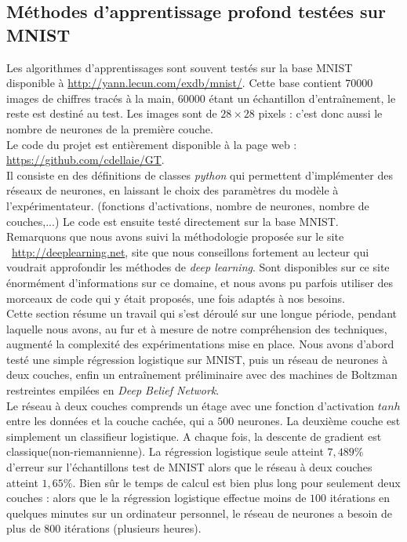 \documentclass{article}
\theoremstyle{definition}
\begin{document}
\subsection{Méthodes d'apprentissage profond testées sur MNIST}

Les algorithmes d'apprentissages sont souvent testés sur la base MNIST disponible à \url{http://yann.lecun.com/exdb/mnist/}. Cette base contient $70 000$ images de chiffres tracés à la main, $60 000$ étant un échantillon d'entraînement, le reste est destiné au test. Les images sont de $28\times 28$ pixels : c'est donc aussi le nombre de neurones de la première couche.\\

Le code du projet est entièrement disponible à la page web : \url{https://github.com/cdellaie/GT}.\\

Il consiste en des définitions de classes \textit{python} qui permettent d'implémenter des réseaux de neurones, en laissant le choix des paramètres du modèle à l'expérimentateur. (fonctions d'activations, nombre de neurones, nombre de couches,...) Le code est ensuite testé directement sur la base MNIST. Remarquons que nous avons suivi la méthodologie proposée sur le site ~\url{http://deeplearning.net}, site que nous conseillons fortement au lecteur qui voudrait approfondir les méthodes de \textit{deep learning}. Sont disponibles sur ce site énormément d'informations sur ce domaine, et nous avons pu parfois utiliser des morceaux de code qui y était proposés, une fois adaptés à nos besoins.\\

Cette section résume un travail qui s'est déroulé sur une longue période, pendant laquelle nous avons, au fur et à mesure de notre compréhension des techniques, augmenté la complexité des expérimentations mise en place. Nous avons d'abord testé une simple régression logistique sur MNIST, puis un réseau de neurones à deux couches, enfin un entraînement préliminaire avec des machines de Boltzman restreintes empilées en \textit{Deep Belief Network}. \\

Le réseau à deux couches comprends un étage avec une fonction d'activation $tanh$ entre les données et la couche cachée, qui a $500$ neurones. La deuxième couche est simplement un classifieur logistique. A chaque fois, la descente de gradient est classique(non-riemannienne). La régression logistique seule atteint $7,489\%$ d'erreur sur l'échantillons test de MNIST alors que le réseau à deux couches atteint $1,65\%$. Bien sûr le temps de calcul est bien plus long pour seulement deux couches : alors que le la régression logistique effectue moins de $100$ itérations en quelques minutes sur un ordinateur personnel, le réseau de neurones a besoin de plus de $800$ itérations (plusieurs heures). \\
\end{document}
